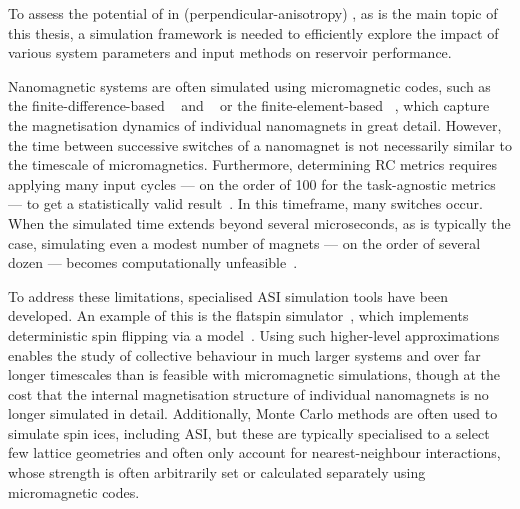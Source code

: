 To assess the potential of  in (perpendicular-anisotropy) , as is the main topic of this thesis, a simulation framework is needed to efficiently explore the impact of various system parameters and input methods on reservoir performance. \par
Nanomagnetic systems are often simulated using micromagnetic codes, such as the finite-difference-based \mumax~\cite{mumax3} and \oommf~\cite{OOMMF} or the finite-element-based \nmag~\cite{Nmag}, which capture the magnetisation dynamics of individual nanomagnets in great detail.
However, the time between successive switches of a nanomagnet is not necessarily similar to the timescale of micromagnetics.
Furthermore, determining RC metrics requires applying many input cycles --- on the order of 100 for the task-agnostic metrics --- to get a statistically valid result~\cite{RC_TaskAgnosticMetrics_v2}.
In this timeframe, many switches occur.
When the simulated time extends beyond several microseconds, as is typically the case, simulating even a modest number of magnets --- on the order of several dozen --- becomes computationally unfeasible~\cite{leo2021chiral}. \\\par

To address these limitations, specialised ASI simulation tools have been developed.
An example of this is the flatspin simulator~\cite{flatspin}, which implements deterministic spin flipping via a  model~\cite{StonerWohlfarth2008}.
Using such higher-level approximations enables the study of collective behaviour in much larger systems and over far longer timescales than is feasible with micromagnetic simulations, though at the cost that the internal magnetisation structure of individual nanomagnets is no longer simulated in detail.
Additionally, Monte Carlo methods are often used to simulate spin ices, including ASI, but these are typically specialised to a select few lattice geometries and often only account for nearest-neighbour interactions, whose strength is often arbitrarily set or calculated separately using micromagnetic codes.~\cite{MeltingASI,sklenar2019field,gilbert2014emergent,zhang2013crystallites} \\\par %

